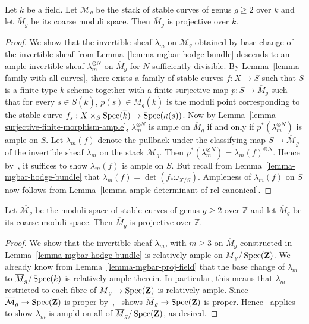 \begin{lemma}
\label{lemma-mgbar-proj-field}
Let $k$ be a field.
Let $\overline{\mathcal{M}}_g$ be the stack of stable curves of genus $g \geq 2$
over $k$ and let $\overline{M}_g$ be its coarse moduli space.
Then $\overline{M}_g$ is projective over $k$.
\end{lemma}

\begin{proof}
We show that the invertible sheaf $\lambda_m$ on $\overline{\mathcal{M}}_g$
obtained by base change of the invertible sheaf from
Lemma~\ref{lemma-mgbar-hodge-bundle} descends to an ample
invertible sheaf $\lambda_m^{\otimes N}$ on $\overline{M}_g$ for $N$
sufficiently divisible.
By Lemma~\ref{lemma-family-with-all-curves}, there exists a family of stable
curves $f : X \to S$ such that $S$ is a finite type $k$-scheme together with
a finite surjective map $p : S \to \overline{M}_g$ such that for every
$s \in S(\overline k)$, $p(s) \in \overline{M}_g(\overline k)$ is
the moduli point corresponding to the stable curve
$f_s : X \times_S \mathop{\rm Spec}(\overline k) \to \mathop{\rm Spec}(\kappa(s))$.
Now by Lemma~\ref{lemma-surjective-finite-morphism-ample},
$\lambda_m^{\otimes N}$ is ample on $\overline{M}_g$ if and only if
$p^*(\lambda_m^{\otimes N})$ is ample on $S$.
Let $\lambda_m(f)$ denote the pullback under the classifying map
$S \to \overline{\mathcal{M}}_g$ of the invertible sheaf $\lambda_m$ on the
stack $\overline{\mathcal{M}}_g$.
Then $p^*(\lambda_m^{\otimes N}) = \lambda_m(f)^{\otimes N}$.
Hence by~, it suffices to show $\lambda_m(f)$ is ample on $S$.
But recall from Lemma~\ref{lemma-mgbar-hodge-bundle} that
$\lambda_m(f) = \det(f_*\omega_{X/S})$.
Ampleness of $\lambda_m(f)$ on $S$ now follows from
Lemma~\ref{lemma-ample-determinant-of-rel-canonical}.
\end{proof}


\begin{theorem}
\label{theorem-mgbar-proj}
Let $\overline{\mathcal{M}_g}$ be the moduli space of stable curves of genus
$g \geq 2$ over $\mathbb{Z}$ and let $\overline{M}_g$ be its coarse moduli
space.
Then $\overline{M}_g$ is projective over $\mathbb{Z}$.
\end{theorem}

\begin{proof}
We show that the invertible sheaf $\lambda_m$, with $m \geq 3$ on
$\overline{M}_g$ constructed in Lemma~\ref{lemma-mgbar-hodge-bundle} is
relatively ample on $\overline{M}_g/\mathop{\rm Spec}(\mathbf{Z})$.
We already know from Lemma~\ref{lemma-mgbar-proj-field} that the base
change of $\lambda_m$ to $\overline{M}_g/\mathop{\rm Spec}(k)$ is relatively ample therein.
In particular, this means that $\lambda_m$ restricted to each fibre of
$\overline{M}_g \to \mathop{\rm Spec}(\mathbf{Z})$ is relatively ample.
Since $\overline{\mathcal{M}}_g \to \mathop{\rm Spec}(\mathbf{Z})$ is proper
by~,~ shows $\overline{M}_g \to \mathop{\rm Spec}(\mathbf{Z})$ is
proper.
Hence~ applies to show $\lambda_m$ is ampld on all of
$\overline{M}_g/\mathop{\rm Spec}(\mathbf{Z})$, as desired.
\end{proof}




